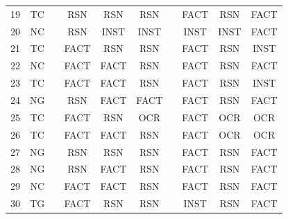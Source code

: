 \begin{table}[h]
{\begin{tabular}{cccccccccc@{}}
19 & {\color[HTML]{EA4335} TC} &  & {\color[HTML]{4285F4} RSN} & {\color[HTML]{4285F4} RSN} & {\color[HTML]{4285F4} RSN} &  & {\color[HTML]{EA4335} FACT} & {\color[HTML]{4285F4} RSN} & {\color[HTML]{EA4335} FACT} \\
20 & {\color[HTML]{34A853} NC} &  & {\color[HTML]{4285F4} RSN} & INST & INST &  & INST & INST & {\color[HTML]{EA4335} FACT} \\
21 & {\color[HTML]{EA4335} TC} &  & {\color[HTML]{EA4335} FACT} & {\color[HTML]{4285F4} RSN} & {\color[HTML]{4285F4} RSN} &  & {\color[HTML]{EA4335} FACT} & {\color[HTML]{4285F4} RSN} & INST \\
22 & {\color[HTML]{34A853} NC} &  & {\color[HTML]{EA4335} FACT} & {\color[HTML]{EA4335} FACT} & {\color[HTML]{4285F4} RSN} &  & {\color[HTML]{EA4335} FACT} & {\color[HTML]{4285F4} RSN} & {\color[HTML]{EA4335} FACT} \\
23 & {\color[HTML]{EA4335} TC} &  & {\color[HTML]{EA4335} FACT} & {\color[HTML]{EA4335} FACT} & {\color[HTML]{4285F4} RSN} &  & {\color[HTML]{EA4335} FACT} & {\color[HTML]{4285F4} RSN} & INST \\
24 & {\color[HTML]{4285F4} NG} &  & {\color[HTML]{4285F4} RSN} & {\color[HTML]{EA4335} FACT} & {\color[HTML]{EA4335} FACT} &  & {\color[HTML]{EA4335} FACT} & {\color[HTML]{4285F4} RSN} & {\color[HTML]{EA4335} FACT} \\
25 & {\color[HTML]{EA4335} TC} &  & {\color[HTML]{EA4335} FACT} & {\color[HTML]{4285F4} RSN} & {\color[HTML]{FF6D01} OCR} &  & {\color[HTML]{EA4335} FACT} & {\color[HTML]{FF6D01} OCR} & {\color[HTML]{FF6D01} OCR} \\
26 & {\color[HTML]{EA4335} TC} &  & {\color[HTML]{EA4335} FACT} & {\color[HTML]{EA4335} FACT} & {\color[HTML]{4285F4} RSN} &  & {\color[HTML]{EA4335} FACT} & {\color[HTML]{FF6D01} OCR} & {\color[HTML]{FF6D01} OCR} \\
27 & {\color[HTML]{4285F4} NG} &  & {\color[HTML]{4285F4} RSN} & {\color[HTML]{4285F4} RSN} & {\color[HTML]{4285F4} RSN} &  & {\color[HTML]{EA4335} FACT} & {\color[HTML]{4285F4} RSN} & {\color[HTML]{EA4335} FACT} \\
28 & {\color[HTML]{4285F4} NG} &  & {\color[HTML]{4285F4} RSN} & {\color[HTML]{EA4335} FACT} & {\color[HTML]{4285F4} RSN} &  & {\color[HTML]{EA4335} FACT} & {\color[HTML]{4285F4} RSN} & {\color[HTML]{EA4335} FACT} \\
29 & {\color[HTML]{34A853} NC} &  & {\color[HTML]{EA4335} FACT} & {\color[HTML]{EA4335} FACT} & {\color[HTML]{4285F4} RSN} &  & {\color[HTML]{EA4335} FACT} & {\color[HTML]{4285F4} RSN} & {\color[HTML]{EA4335} FACT} \\
30 & {\color[HTML]{FF6D01} TG} &  & {\color[HTML]{EA4335} FACT} & {\color[HTML]{4285F4} RSN} & {\color[HTML]{4285F4} RSN} &  & INST & {\color[HTML]{4285F4} RSN} & {\color[HTML]{EA4335} FACT} \\
    \bottomrule
    \hline
    
  \end{tabular}
  }
  \label{tab:reas_failure_cases}
\end{table}

